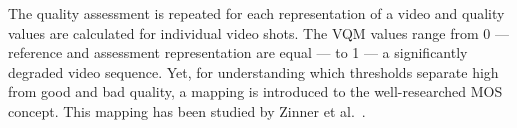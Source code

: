 The quality assessment is repeated for each representation of a video and quality values are calculated for individual video shots. 
%
%
The \ac{VQM} values range from 0 --- reference and assessment representation are equal --- to 1 --- a significantly degraded video sequence.
Yet, for understanding which thresholds separate high from good and bad quality, a mapping is introduced to the well-researched \ac{MOS} concept.
This mapping has been studied by Zinner et al.~\cite{Zinner2010}.%

